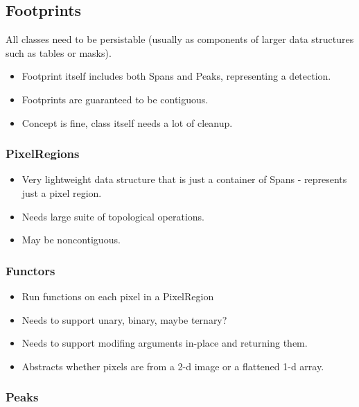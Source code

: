 \subsection{Footprints}
\label{sec:spFootprints}

All classes need to be persistable (usually as components of larger data structures such as tables or masks).

\begin{itemize}
\item Footprint itself includes both Spans and Peaks, representing a detection.
\item Footprints are guaranteed to be contiguous.
\item Concept is fine, class itself needs a lot of cleanup.
\end{itemize}

\subsubsection{PixelRegions}
\label{sec:spFootprintsPixelRegions}

\begin{itemize}
\item Very lightweight data structure that is just a container of Spans - represents just a pixel region.
\item Needs large suite of topological operations.
\item May be noncontiguous.
\end{itemize}

\subsubsection{Functors}
\label{sec:spFootprintsFunctors}

\begin{itemize}
\item Run functions on each pixel in a PixelRegion
\item Needs to support unary, binary, maybe ternary?
\item Needs to support modifing arguments in-place and returning them.
\item Abstracts whether pixels are from a 2-d image or a flattened 1-d array.
\end{itemize}


\subsubsection{Peaks}
\label{sec:spFootprintsPeaks}


